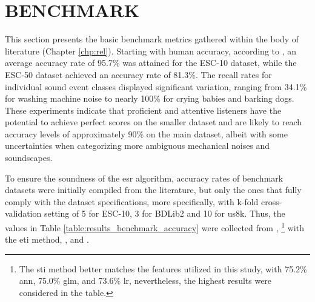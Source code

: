 \section{BENCHMARK}
\label{sec:results_metrics}


This section presents the basic benchmark metrics gathered within the body of literature (Chapter \ref{chp:rel}). Starting with human accuracy, according to \textcite{PiczakESC2015}, an average accuracy rate of 95.7\% was attained for the ESC-10 dataset, while the ESC-50 dataset achieved an accuracy rate of 81.3\%. The recall rates for individual sound event classes displayed significant variation, ranging from 34.1\% for washing machine noise to nearly 100\% for crying babies and barking dogs. These experiments indicate that proficient and attentive listeners have the potential to achieve perfect scores on the smaller dataset and are likely to reach accuracy levels of approximately 90\% on the main dataset, albeit with some uncertainties when categorizing more ambiguous mechanical noises and soundscapes.

To ensure the soundness of the \gls{esr} algorithm, accuracy rates of benchmark datasets were initially compiled from the literature, but only the ones that fully comply with the dataset specifications, more specifically, with k-fold cross-validation setting of 5 for ESC-10, 3 for BDLib2 and 10 for \gls{us8k}. Thus, the values in Table \ref{table:results_benchmark_accuracy} were collected from \textcite{PiczakESC2015}, \textcite{Bountourakis2019}\footnote{The \gls{sti} method better matches the features utilized in this study, with 75.2\% \gls{ann}, 75.0\% \gls{glm}, and 73.6\% \gls{lr}, nevertheless, the highest results were considered in the table.} with the \gls{eti} method,  \textcite{Salamon2014}, and \textcite{Vandendriessche2021}.

